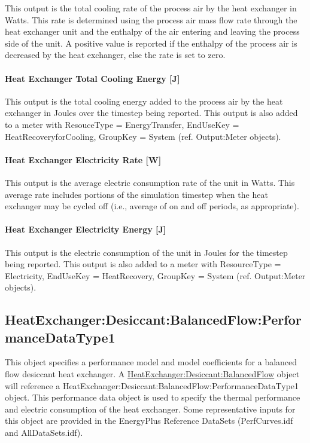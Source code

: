 This output is the total cooling rate of the process air by the heat exchanger in Watts. This rate is determined using the process air mass flow rate through the heat exchanger unit and the enthalpy of the air entering and leaving the process side of the unit. A positive value is reported if the enthalpy of the process air is decreased by the heat exchanger, else the rate is set to zero.

\paragraph{Heat Exchanger Total Cooling Energy {[}J{]}}\label{heat-exchanger-total-cooling-energy-j-2}

This output is the total cooling energy added to the process air by the heat exchanger in Joules over the timestep being reported. This output is also added to a meter with ResouceType = EnergyTransfer, EndUseKey = HeatRecoveryforCooling, GroupKey = System (ref. Output:Meter objects).

\paragraph{Heat Exchanger Electricity Rate {[}W{]}}\label{heat-exchanger-electric-power-w-2}

This output is the average electric consumption rate of the unit in Watts. This average rate includes portions of the simulation timestep when the heat exchanger may be cycled off (i.e., average of on and off periods, as appropriate).

\paragraph{Heat Exchanger Electricity Energy {[}J{]}}\label{heat-exchanger-electric-energy-j-2}

This output is the electric consumption of the unit in Joules for the timestep being reported. This output is also added to a meter with ResourceType = Electricity, EndUseKey = HeatRecovery, GroupKey = System (ref. Output:Meter objects).

\subsection{HeatExchanger:Desiccant:BalancedFlow:PerformanceDataType1}\label{heatexchangerdesiccantbalancedflowperformancedatatype1}

This object specifies a performance model and model coefficients for a balanced flow desiccant heat exchanger. A \hyperref[heatexchangerdesiccantbalancedflow]{HeatExchanger:Desiccant:BalancedFlow} object will reference a HeatExchanger:Desiccant:BalancedFlow:PerformanceDataType1 object. This performance data object is used to specify the thermal performance and electric consumption of the heat exchanger. Some representative inputs for this object are provided in the EnergyPlus Reference DataSets (PerfCurves.idf and AllDataSets.idf).

